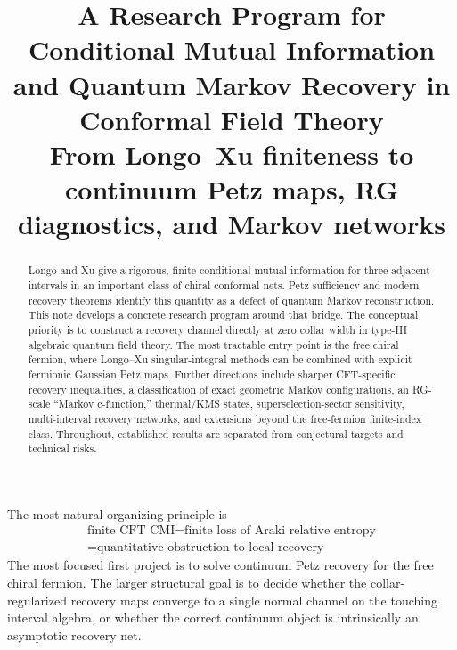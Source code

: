 \documentclass[11pt]{article}
\title{\vspace{-1.5cm}\color{navy}\bfseries
A Research Program for Conditional Mutual Information\newline
and Quantum Markov Recovery in Conformal Field Theory\\[0.4em]
\large From Longo--Xu finiteness to continuum Petz maps, RG diagnostics, and Markov networks}
\author{}
\date{}
\theoremstyle{accenttheorem}
\theoremstyle{definition}
\newcommand{\1}{\mathbf{1}}
\begin{document}
\maketitle
\vspace{-1.5em}

\begin{abstract}
Longo and Xu give a rigorous, finite conditional mutual information for three adjacent intervals in an important class of chiral conformal nets.  Petz sufficiency and modern recovery theorems identify this quantity as a defect of quantum Markov reconstruction.  This note develops a concrete research program around that bridge.  The conceptual priority is to construct a recovery channel directly at zero collar width in type-III algebraic quantum field theory.  The most tractable entry point is the free chiral fermion, where Longo--Xu singular-integral methods can be combined with explicit fermionic Gaussian Petz maps.  Further directions include sharper CFT-specific recovery inequalities, a classification of exact geometric Markov configurations, an RG-scale ``Markov c-function,'' thermal/KMS states, superselection-sector sensitivity, multi-interval recovery networks, and extensions beyond the free-fermion finite-index class.  Throughout, established results are separated from conjectural targets and technical risks.
\end{abstract}

\begin{mainbox}
The most natural organizing principle is
\[
\boxed{
\begin{gathered}
\text{finite CFT CMI}
 = \text{finite loss of Araki relative entropy}\\[-1mm]
 = \text{quantitative obstruction to local recovery}
\end{gathered}}
\]
The most focused first project is to solve continuum Petz recovery for the free chiral fermion.  The larger structural goal is to decide whether the collar-regularized recovery maps converge to a single normal channel on the touching interval algebra, or whether the correct continuum object is intrinsically an asymptotic recovery net.
\end{mainbox}

\vspace{0.6em}
\begin{center}
\end{center}
\end{document}
